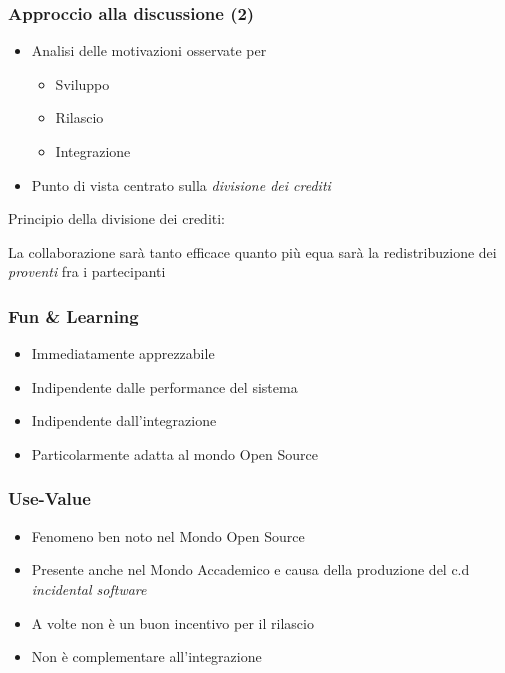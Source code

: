 \begin{frame}\frametitle{Approccio alla discussione (2)}

\begin{itemize}[<+->]
\itemsep1pt\parskip0pt
\item
  Analisi delle motivazioni osservate per

  \begin{itemize}[<+->]
  \itemsep1pt\parskip0pt
  \item
    Sviluppo
  \item
    Rilascio
  \item
    Integrazione
  \end{itemize}
\item
  Punto di vista centrato sulla \alert{\em{divisione dei crediti}}
\end{itemize}

\begin{block}{Principio della divisione dei crediti:}

La collaborazione sarà tanto \alert{efficace} quanto più \alert{equa}
sarà la redistribuzione dei \emph{proventi} fra i partecipanti

\end{block}

\end{frame}

\begin{frame}\frametitle{Fun \& Learning}

\begin{itemize}[<+->]
\itemsep1pt\parskip0pt
\item
  Immediatamente apprezzabile
\item
  Indipendente dalle performance del sistema
\item
  Indipendente dall'integrazione
\item
  Particolarmente adatta al mondo Open Source
\end{itemize}

\end{frame}

\begin{frame}\frametitle{Use-Value}

\begin{itemize}[<+->]
\itemsep1pt\parskip0pt
\item
  Fenomeno ben noto nel Mondo Open Source
\item
  Presente anche nel Mondo Accademico e causa della produzione del c.d
  \emph{incidental software}
\item
  A volte non è un buon incentivo per il rilascio
\item
  Non è complementare all'integrazione
\end{itemize}

\end{frame}

